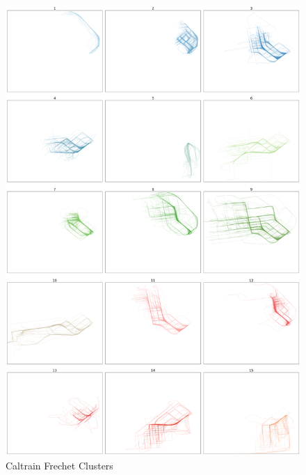 \documentclass[a4paper, 12pt]{article}
\begin{document}
\begin{figure}[htbp!]
    \centering
    \includegraphics[width=1\textwidth]{Caltrain Frechet.png}
    \caption{Caltrain Frechet Clusters}
    \label{fig39}
\end{figure}
\end{document}
